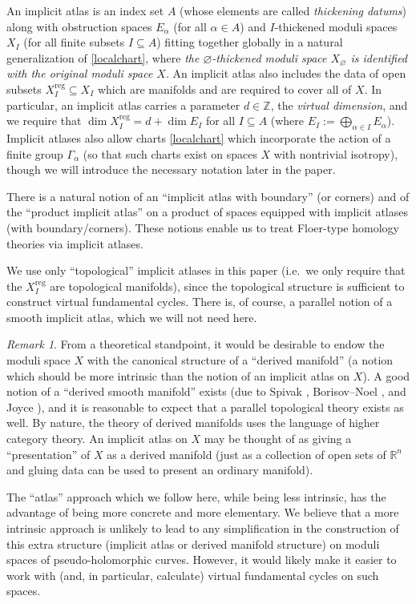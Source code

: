 \documentclass[12pt]{article}
\theoremstyle{definition}
\theoremstyle{remark}
\newtheorem{remark}[theorem]{Remark}
\numberwithin{equation}{subsection}
\newcommand{\ZZ}{\mathbb Z}
\newcommand{\RR}{\mathbb R}
\newcommand{\reg}{\mathrm{reg}}
\begin{document}
An implicit atlas is an index set $A$ (whose elements are called \emph{thickening datums}) along with obstruction spaces $E_\alpha$ (for all $\alpha\in A$) and $I$-thickened moduli spaces $X_I$ (for all finite subsets $I\subseteq A$) fitting together globally in a natural generalization of \eqref{localchart}, where \emph{the $\varnothing$-thickened moduli space $X_\varnothing$ is identified with the original moduli space $X$}.  An implicit atlas also includes the data of open subsets $X_I^\reg\subseteq X_I$ which are manifolds and are required to cover all of $X$.  In particular, an implicit atlas carries a parameter $d\in\ZZ$, the \emph{virtual dimension}, and we require that $\dim X_I^\reg=d+\dim E_I$ for all $I\subseteq A$ (where $E_I:=\bigoplus_{\alpha\in I}E_\alpha$).  Implicit atlases also allow charts \eqref{localchart} which incorporate the action of a finite group $\Gamma_\alpha$ (so that such charts exist on spaces $X$ with nontrivial isotropy), though we will introduce the necessary notation later in the paper.

There is a natural notion of an ``implicit atlas with boundary'' (or corners) and of the ``product implicit atlas'' on a product of spaces equipped with implicit atlases (with boundary/corners).  These notions enable us to treat Floer-type homology theories via implicit atlases.

We use only ``topological'' implicit atlases in this paper (i.e.\ we only require that the $X_I^\reg$ are topological manifolds), since the topological structure is sufficient to construct virtual fundamental cycles.  There is, of course, a parallel notion of a smooth implicit atlas, which we will not need here.

\begin{remark}
From a theoretical standpoint, it would be desirable to endow the moduli space $X$ with the canonical structure of a ``derived manifold'' (a notion which should be more intrinsic than the notion of an implicit atlas on $X$).  A good notion of a ``derived smooth manifold'' exists (due to Spivak \cite{spivak}, Borisov--Noel \cite{borisovnoel}, and Joyce \cite{joyceI,joyceII}), and it is reasonable to expect that a parallel topological theory exists as well.  By nature, the theory of derived manifolds uses the language of higher category theory.  An implicit atlas on $X$ may be thought of as giving a ``presentation'' of $X$ as a derived manifold (just as a collection of open sets of $\RR^n$ and gluing data can be used to present an ordinary manifold).

The ``atlas'' approach which we follow here, while being less intrinsic, has the advantage of being more concrete and more elementary.  We believe that a more intrinsic approach is unlikely to lead to any simplification in the construction of this extra structure (implicit atlas or derived manifold structure) on moduli spaces of pseudo-holomorphic curves.  However, it would likely make it easier to work with (and, in particular, calculate) virtual fundamental cycles on such spaces.
\end{remark}
\end{document}
